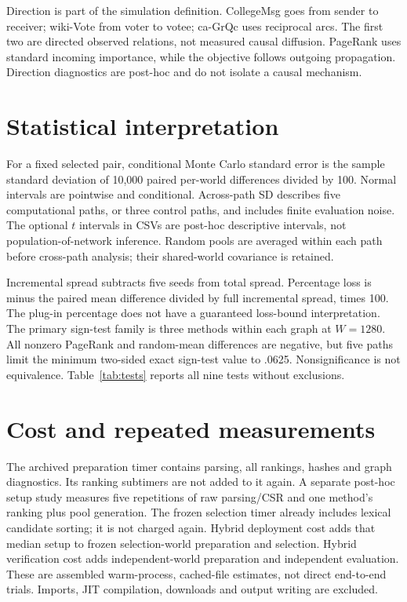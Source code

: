 \documentclass[smallextended]{svjour3}
\begin{document}
Direction is part of the simulation definition. CollegeMsg goes from sender to
receiver; wiki-Vote from voter to votee; ca-GrQc uses reciprocal arcs. The first
two are directed observed relations, not measured causal diffusion. PageRank uses
standard incoming importance, while the objective follows outgoing propagation.
Direction diagnostics are post-hoc and do not isolate a causal mechanism.

\section{Statistical interpretation}
For a fixed selected pair, conditional Monte Carlo standard error is the sample
standard deviation of 10,000 paired per-world differences divided by 100.
Normal intervals are pointwise and conditional. Across-path SD describes five
computational paths, or three control paths, and includes finite evaluation noise.
The optional $t$ intervals in CSVs are post-hoc descriptive intervals, not
population-of-network inference. Random pools are averaged within each path
before cross-path analysis; their shared-world covariance is retained.

Incremental spread subtracts five seeds from total spread. Percentage loss is
minus the paired mean difference divided by full incremental spread, times 100.
The plug-in percentage does not have a guaranteed loss-bound interpretation.
The primary sign-test family is three methods within each graph at $W=1280$.
All nonzero PageRank and random-mean differences are negative, but five paths
limit the minimum two-sided exact sign-test value to .0625. Nonsignificance is
not equivalence. Table~\ref{tab:tests} reports all nine tests without exclusions.

\section{Cost and repeated measurements}
The archived preparation timer contains parsing, all rankings, hashes and graph
diagnostics. Its ranking subtimers are not added to it again. A separate
post-hoc setup study measures five repetitions of raw parsing/CSR and one
method's ranking plus pool generation. The frozen selection timer already includes
lexical candidate sorting; it is not charged again. Hybrid deployment cost adds that
median setup to frozen selection-world preparation and selection. Hybrid
verification cost adds independent-world preparation and independent evaluation.
These are assembled warm-process, cached-file estimates, not direct end-to-end
trials. Imports, JIT compilation, downloads and output writing are excluded.
\end{document}
